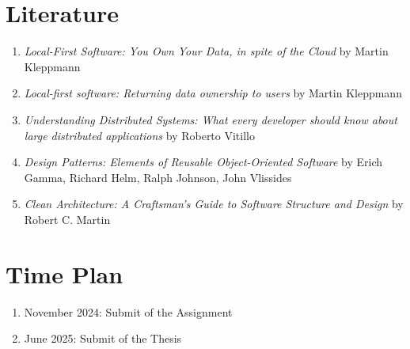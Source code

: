 \documentclass{article}
\begin{document}
	\section{Literature}
	\begin{enumerate}
		\item \textit{Local-First Software: You Own Your Data, in spite of the Cloud} by Martin Kleppmann
		\item \textit{Local-first software: Returning data ownership to users} by Martin Kleppmann
		\item \textit{Understanding Distributed Systems: What every developer should know about large distributed applications} by Roberto Vitillo
		\item \textit{Design Patterns: Elements of Reusable Object-Oriented Software} by Erich Gamma, Richard Helm, Ralph Johnson, John Vlissides
		\item \textit{Clean Architecture: A Craftsman's Guide to Software Structure and Design} by Robert C. Martin
	\end{enumerate}
	\section{Time Plan}
	\begin{enumerate}
		\item November 2024: Submit of the Assignment
		\item June 2025: Submit of the Thesis
	\end{enumerate}
\end{document}
